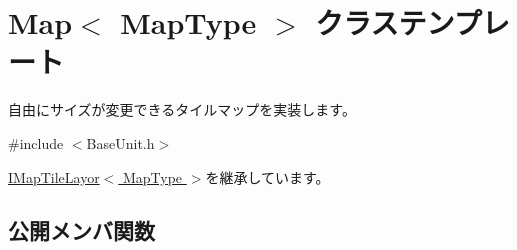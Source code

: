 \hypertarget{class_map}{}\section{Map$<$ Map\+Type $>$ クラステンプレート}
\label{class_map}


自由にサイズが変更できるタイルマップを実装します。 




{\ttfamily \#include $<$Base\+Unit.\+h$>$}



\hyperlink{class_i_map_tile_layor}{I\+Map\+Tile\+Layor$<$ Map\+Type $>$}を継承しています。

\subsection*{公開メンバ関数}
